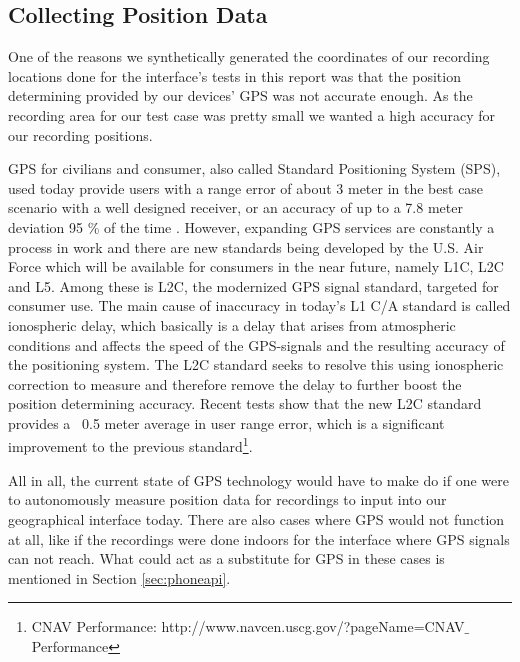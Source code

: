 \subsection{Collecting Position Data}
\label{sec:collectingpositiondata}
One of the reasons we synthetically generated the coordinates of our recording locations done for the interface’s tests in this report was that the position determining provided by our devices’ GPS was not accurate enough. As the recording area for our test case was pretty small we wanted a high accuracy for our recording positions. 

GPS for civilians and consumer, also called Standard Positioning System (SPS), used today provide users with a range error of about 3 meter in the best case scenario with a well designed receiver, or an accuracy of up to a 7.8 meter deviation 95 \% of the time \cite{spsperf}. However, expanding GPS services are constantly a process in work and there are new standards being developed by the U.S. Air Force which will be available for consumers in the near future, namely L1C, L2C and L5. Among these is L2C, the modernized GPS signal standard, targeted for consumer use. The main cause of inaccuracy in today’s L1 C/A standard is called ionospheric delay, which basically is a delay that arises from atmospheric conditions and affects the speed of the GPS-signals and the resulting accuracy of the positioning system. The L2C standard seeks to resolve this using ionospheric correction to measure and therefore remove the delay to further boost the position determining accuracy.\cite{gpsdir} Recent tests show that the new L2C standard provides a ~0.5 meter average in user range error, which is a significant improvement to the previous standard\footnote{CNAV Performance: http://www.navcen.uscg.gov/?pageName=CNAV$\_$Performance}.

All in all, the current state of GPS technology would have to make do if one were to autonomously measure position data for recordings to input into our geographical interface today. There are also cases where GPS would not function at all, like if the recordings were done indoors for the interface where GPS signals can not reach. What could act as a substitute for GPS in these cases is mentioned in Section \ref{sec:phoneapi}.

